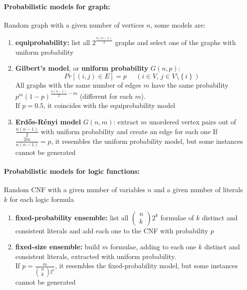 \documentclass[11pt]{article}
\begin{document}
	\paragraph{Probabilistic models for graph:} Random graph with a given number of vertices $n$, some models are: 
	\begin{enumerate}
		\item \textbf{equiprobability:} list all $2^{\frac{n(n-1)}{2}}$ graphs and select one of the graphs with uniform probability
		\item \textbf{Gilbert’s model}, or \textbf{uniform probability} $G (n, p)$:
		$$ Pr  \left[(i,j) \in E \right] = p \;\;\;\;\; \left(i \in V , \, j \in V \setminus \left\{i\right\}\right)$$
		All graphs with the same number of edges $m$ have the same probability $p^m (1 − p)^{\frac{n(n-1)}{2} - m}$ (different for each $m$).\\
		If $p = 0.5$, it coincides with the equiprobability model
		\item \textbf{Erd\H{o}s-R\'enyi model} $G (n, m)$: extract $m$ unordered vertex pairs out of $\frac{n(n-1)}{2}$ with uniform probability and create an edge for each one
		If $\frac{2m}{n(n-1)} = p$, it resembles the uniform probability model, but some instances cannot be generated
	\end{enumerate}
	
	\paragraph{Probabilistic models for logic functions:} Random CNF with a given number of variables $n$ and a given number of literals $k$ for each logic formula
	\begin{enumerate}
		\item \textbf{fixed-probability ensemble:} list all $\left(\begin{array}{c} n \\ k\end{array}\right) 2^k$ formulae of $k$ distinct and consistent literals and add each one to the CNF with probability $p$
		\item \textbf{fixed-size ensemble:} build $m$ formulae, adding to each one $k$ distinct and consistent literals, extracted with uniform probability.\\
		If $p = \frac{m}{\left(\begin{array}{c} n \\ k\end{array}\right) 2^k}$, it resembles the fixed-probability model, but some instances cannot be generated
	\end{enumerate}
	
\end{document}
